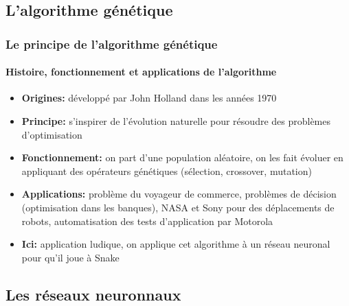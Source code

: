 \documentclass[10pt]{beamer}
\begin{document}
\subsection{L'algorithme génétique}

\begin{frame}
  \frametitle{Le principe de l'algorithme génétique}
  \framesubtitle{Histoire, fonctionnement et applications de l'algorithme}

  \begin{itemize}

    \item \textbf{Origines:} développé par John Holland dans les années 1970

    \item \textbf{Principe:} s'inspirer de l'évolution naturelle pour
    résoudre des problèmes d'optimisation

    \item \textbf{Fonctionnement:} on part d'une population aléatoire, on les fait évoluer en appliquant des opérateurs
    génétiques (sélection, crossover, mutation)

    \item \textbf{Applications:} problème du voyageur de commerce, problèmes de décision (optimisation dans les banques), NASA et Sony pour des déplacements de robots, automatisation des tests d'application par Motorola
    
    \item \textbf{Ici:} application ludique, on applique cet algorithme à un réseau neuronal pour qu'il joue à Snake
   

  \end{itemize}  
  \end{frame}

\subsection{Les réseaux neuronnaux}
\end{document}
